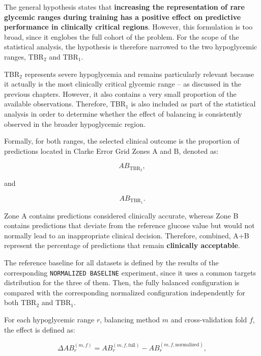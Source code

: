 The general hypothesis states that \textbf{increasing the representation of rare glycemic ranges during training has a positive effect on predictive performance in clinically critical regions}. However, this formulation is too broad, since it englobes the full cohort of the problem. For the scope of the statistical analysis, the hypothesis is therefore narrowed to the two hypoglycemic ranges, TBR$_2$ and TBR$_1$.

TBR$_2$ represents severe hypoglycemia and remains particularly relevant because it actually is the most clinically critical glycemic range -- as discussed in the previous chapters. However, it also contains a very small proportion of the available observations. Therefore, TBR$_1$ is also included as part of the statistical analysis in order to determine whether the effect of balancing is consistently observed in the broader hypoglycemic region.

Formally, for both ranges, the selected clinical outcome is the proportion of predictions located in Clarke Error Grid Zones A and B, denoted as:

\begin{equation}
AB_{\mathrm{TBR_2}},
\end{equation}

and

\begin{equation}
AB_{\mathrm{TBR_1}}.
\end{equation}

Zone A contains predictions considered clinically accurate, whereas Zone B contains predictions that deviate from the reference glucose value but would not normally lead to an inappropriate clinical decision. Therefore, combined, A+B represent the percentage of predictions that remain \textbf{clinically acceptable}.

The reference baseline for all datasets is defined by the results of the corresponding \texttt{NORMALIZED BASELINE} experiment, since it uses a common targets distribution for the three of them. Then, the fully balanced configuration is compared with the corresponding normalized configuration independently for both TBR$_2$ and TBR$_1$.

For each hypoglycemic range \(r\), balancing method \(m\) and cross-validation fold \(f\), the effect
is defined as:

\begin{equation}
\Delta AB_{r}^{(m,f)}
=
AB_{r}^{(m,f,\mathrm{full})}
-
AB_{r}^{(m,f,\mathrm{normalized})},
\label{eq:delta_ab_hypo}
\end{equation}

